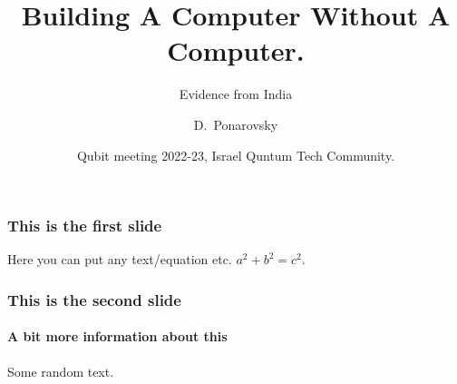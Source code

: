 \documentclass{beamer}
\title[Crisis] %
{Building A Computer Without A Computer.}
\subtitle{Evidence from India}
\author[Author, Anders] %
	{D.~Ponarovsky\inst{1}}
\institute[Universities Here and There] %
	{ \inst{1} Faculty of Computer Science\newline
	  Hebrew University of Jerusalem
	}
\date[2022-23] %
{Qubit meeting 2022-23, Israel Quntum Tech Community.}
\begin{document}
     \maketitle
	\begin{frame}
		\frametitle{This is the first slide}
		Here you can put any text/equation etc. 
		$a^2 + b^2 = c^2$.		
	\end{frame}
	\begin{frame}
		\frametitle{This is the second slide}
		\framesubtitle{A bit more information about this}
		Some random text.		
	\end{frame}
\end{document}
